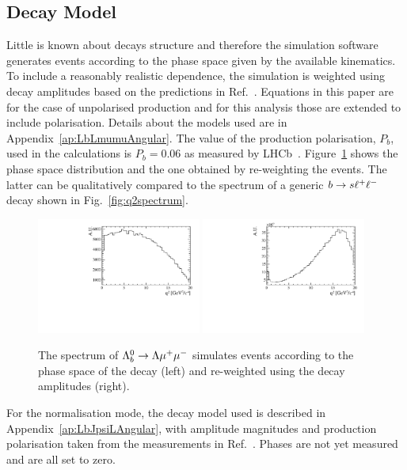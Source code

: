\subsection{Decay Model}
\label{decaymodel}

Little is known about \Lb decays structure and therefore the simulation software generates events
according to the phase space given by the available kinematics. To include a reasonably realistic \qsq dependence,
the simulation is weighted using decay amplitudes based on the predictions in Ref.~\cite{Gutsche:2013pp}.
Equations in this paper are for the case of unpolarised \Lb production and for this analysis those are extended to include polarisation.
Details about the models used are in Appendix~\ref{ap:LbLmumuAngular}. The value of the \Lb production polarisation, $P_b$, 
used in the calculations is $P_b = 0.06$ as measured by LHCb~\cite{Aaij:2013oxa}. 
Figure~\ref{fig:decaymodeleffonq2} shows the phase space \qsq distribution and the one obtained by re-weighting the events.
The latter can be qualitatively compared to the \qsq spectrum of a generic ${b}\rightarrow{\ensuremath{s}}\ell^+ \ell^-$ decay
shown in Fig.~\ref{fig:q2spectrum}.
%
\begin{figure}
\centering
\includegraphics[width=0.48\textwidth]{Lmumu/figs/Q2_beforemodel.pdf}
\includegraphics[width=0.48\textwidth]{Lmumu/figs/Q2_aftermodel.pdf}
\caption{The \qsq spectrum of ${{\Lambda}^0_{b}}\rightarrow{\ensuremath{\Lambda}}{\ensuremath{\mu^+\mu^-}}$ simulates events according to the
phase space of the decay (left) and re-weighted using the decay amplitudes (right).}
\label{fig:decaymodeleffonq2}
\end{figure}
%
For the normalisation mode, the decay model used is described in Appendix~\ref{ap:LbJpsiLAngular},
with amplitude magnitudes and production polarisation taken from the measurements in
Ref.~\cite{Aaij:2013oxa}. Phases are not yet measured and are all set to zero.

